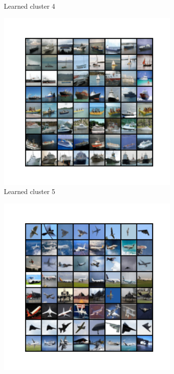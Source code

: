 \documentclass[10pt,twocolumn,letterpaper]{article}
\begin{document}
\begin{figure}
\begin{subfigure}{0.32\textwidth}
       \caption{Learned cluster 4}
       \label{fig:cifar10-4}
     \end{subfigure}
     \hfill
     \begin{subfigure}{0.32\textwidth}
       \includegraphics[width=\linewidth,trim={2cm 2cm 2cm 2cm},clip]{figures/experiments/cifar10_cluster/nearest_class4.png}
       \caption{Learned cluster 5}
       \label{fig:cifar10-5}
     \end{subfigure}
     \hfill
     \begin{subfigure}{0.32\textwidth}
       \includegraphics[width=\linewidth,trim={2cm 2cm 2cm 2cm},clip]{figures/experiments/cifar10_cluster/nearest_class5.png}

\end{subfigure}
\end{figure}
\end{document}

